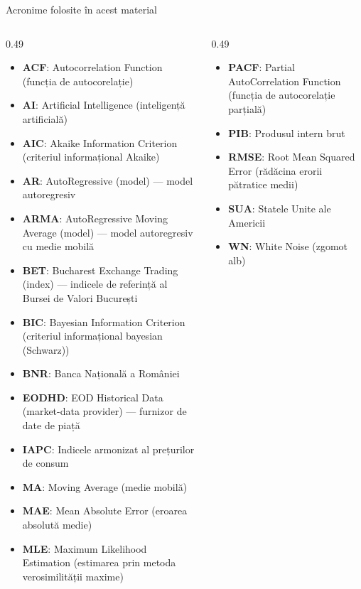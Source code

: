 {
\begin{frame}[noframenumbering]
    \titlepage
\end{frame}
}
\begin{frame}{Acronime folosite în acest material}
\begin{columns}[T]
\begin{column}{0.49\textwidth}
\begin{itemize}\setlength{\itemsep}{0pt}
    \item \textbf{ACF}: Autocorrelation Function (funcția de autocorelație)
    \item \textbf{AI}: Artificial Intelligence (inteligență artificială)
    \item \textbf{AIC}: Akaike Information Criterion (criteriul informațional Akaike)
    \item \textbf{AR}: AutoRegressive (model) — model autoregresiv
    \item \textbf{ARMA}: AutoRegressive Moving Average (model) — model autoregresiv cu medie mobilă
    \item \textbf{BET}: Bucharest Exchange Trading (index) — indicele de referință al Bursei de Valori București
    \item \textbf{BIC}: Bayesian Information Criterion (criteriul informațional bayesian (Schwarz))
    \item \textbf{BNR}: Banca Națională a României
    \item \textbf{EODHD}: EOD Historical Data (market-data provider) — furnizor de date de piață
    \item \textbf{IAPC}: Indicele armonizat al prețurilor de consum
    \item \textbf{MA}: Moving Average (medie mobilă)
    \item \textbf{MAE}: Mean Absolute Error (eroarea absolută medie)
    \item \textbf{MLE}: Maximum Likelihood Estimation (estimarea prin metoda verosimilității maxime)
\end{itemize}
\end{column}
\begin{column}{0.49\textwidth}
\begin{itemize}\setlength{\itemsep}{0pt}
    \item \textbf{PACF}: Partial AutoCorrelation Function (funcția de autocorelație parțială)
    \item \textbf{PIB}: Produsul intern brut
    \item \textbf{RMSE}: Root Mean Squared Error (rădăcina erorii pătratice medii)
    \item \textbf{SUA}: Statele Unite ale Americii
    \item \textbf{WN}: White Noise (zgomot alb)
\end{itemize}
\end{column}
\end{columns}
\end{frame}

